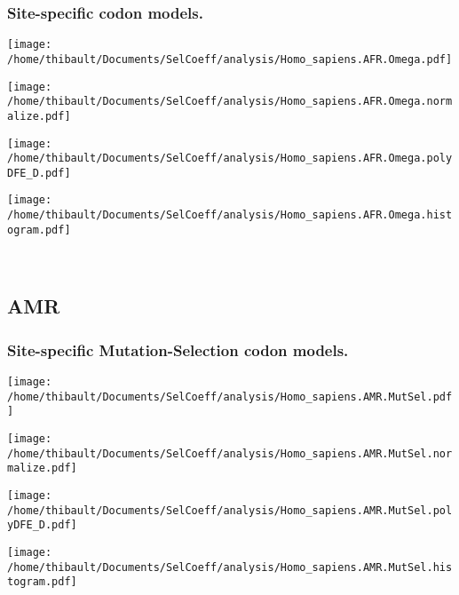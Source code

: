 \subsubsection*{Site-specific codon models.} 
\begin{minipage}{0.49\linewidth} 
\texttt{[image: /home/thibault/Documents/SelCoeff/analysis/Homo\_sapiens.AFR.Omega.pdf]} 
\end{minipage}
\begin{minipage}{0.49\linewidth} 
\texttt{[image: /home/thibault/Documents/SelCoeff/analysis/Homo\_sapiens.AFR.Omega.normalize.pdf]} 
\end{minipage}
\begin{minipage}{0.49\linewidth} 
\texttt{[image: /home/thibault/Documents/SelCoeff/analysis/Homo\_sapiens.AFR.Omega.polyDFE\_D.pdf]} 
\end{minipage}
\begin{minipage}{0.49\linewidth} 
\texttt{[image: /home/thibault/Documents/SelCoeff/analysis/Homo\_sapiens.AFR.Omega.histogram.pdf]} 
\end{minipage}
\\ 
\subsection{AMR} 
 
\subsubsection*{Site-specific Mutation-Selection codon models.} 
\begin{minipage}{0.49\linewidth} 
\texttt{[image: /home/thibault/Documents/SelCoeff/analysis/Homo\_sapiens.AMR.MutSel.pdf]} 
\end{minipage}
\begin{minipage}{0.49\linewidth} 
\texttt{[image: /home/thibault/Documents/SelCoeff/analysis/Homo\_sapiens.AMR.MutSel.normalize.pdf]} 
\end{minipage}
\begin{minipage}{0.49\linewidth} 
\texttt{[image: /home/thibault/Documents/SelCoeff/analysis/Homo\_sapiens.AMR.MutSel.polyDFE\_D.pdf]} 
\end{minipage}
\begin{minipage}{0.49\linewidth} 
\texttt{[image: /home/thibault/Documents/SelCoeff/analysis/Homo\_sapiens.AMR.MutSel.histogram.pdf]} 
\end{minipage}
\\ 
